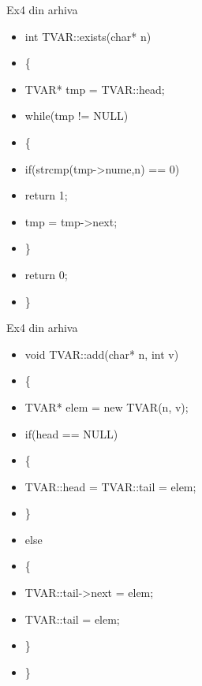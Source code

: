 \documentclass[pdf]{beamer}
\begin{document}
\begin{frame}{Ex4 din arhiva}
\begin{itemize}
\item
int TVAR::exists(char* n)
\item \hspace{4mm}
	\{
\item \hspace{6mm}
	  TVAR* tmp = TVAR::head;
\item \hspace{6mm}
	  while(tmp != NULL)
\item \hspace{6mm}
	  \{
\item \hspace{8mm}  
	    if(strcmp(tmp->nume,n) == 0)
\item \hspace{10mm}
	      return 1;
\item \hspace{10mm}
          tmp = tmp->next;
\item \hspace{6mm}         
	  \}
\item \hspace{6mm}
	  return 0;
\item \hspace{4mm}
	 \}

\end{itemize}
\end{frame}



\begin{frame}{Ex4 din arhiva}
\begin{itemize}
\item
void TVAR::add(char* n, int v)
\item \hspace{4mm}
	 \{
\item \hspace{6mm}
	   TVAR* elem = new TVAR(n, v);
\item \hspace{6mm}
	   if(head == NULL)
\item \hspace{6mm}
	   \{
\item \hspace{8mm}
	     TVAR::head = TVAR::tail = elem;
\item \hspace{6mm}
	   \}
\item \hspace{6mm}
	   else
\item \hspace{6mm}
	   \{
\item \hspace{8mm}
	     TVAR::tail->next = elem;
\item \hspace{8mm}
	     TVAR::tail = elem;
\item \hspace{6mm}	     
	   \}
\item \hspace{4mm}
	 \}
\end{itemize}
\end{frame}
\end{document}
